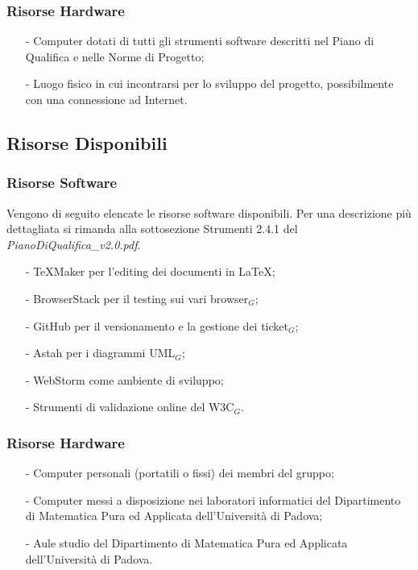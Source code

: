 \subsubsection{Risorse Hardware}
\begin{itemize}
	\item[-] Computer dotati di tutti gli strumenti software descritti nel Piano di Qualifica e nelle Norme di Progetto;
	\item[-] Luogo fisico in cui incontrarsi per lo sviluppo del progetto, possibilmente con una connessione ad Internet.
\end{itemize}

\subsection{Risorse Disponibili}
\subsubsection{Risorse Software}
Vengono di seguito elencate le risorse software disponibili. Per una descrizione più dettagliata si rimanda alla sottosezione Strumenti 2.4.1 del \textit{PianoDiQualifica\_v2.0.pdf}.
\begin{itemize}
	\item[-] TeXMaker per l'editing dei documenti in \LaTeX;
	\item[-] BrowserStack per il testing sui vari browser$_G$;
	\item[-] GitHub per il versionamento e la gestione dei ticket$_G$;
	\item[-] Astah per i diagrammi UML$_G$;
	\item[-] WebStorm come ambiente di sviluppo;
	\item[-] Strumenti di validazione online del W3C$_G$.
\end{itemize}

\subsubsection{Risorse Hardware}
\begin{itemize}
	\item[-] Computer personali (portatili o fissi) dei membri del gruppo; 
	\item[-] Computer messi a disposizione nei laboratori informatici del Dipartimento di Matematica Pura ed Applicata dell'Università di Padova;
	\item[-] Aule studio del Dipartimento di Matematica Pura ed Applicata
	dell'Università di Padova. 
\end{itemize}